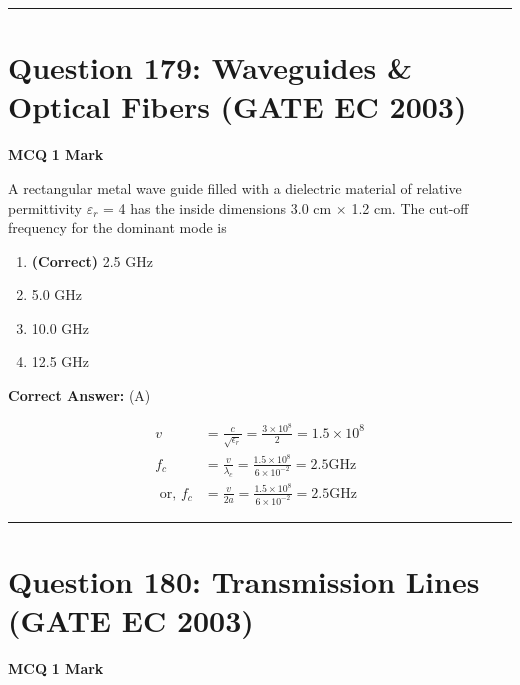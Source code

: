 \documentclass[11pt,a4paper]{article}
\begin{document}
\vspace{1.5em}
\hrule
\vspace{1.5em}

\section*{Question 179: Waveguides \& Optical Fibers (GATE EC 2003)}
\noindent \textbf{\color{primary}MCQ} \hfill \textbf{\color{secondary}1 Mark}


\noindent A rectangular metal wave guide filled with a dielectric material of relative permittivity $\varepsilon _{r}$ = 4 has the inside dimensions 3.0 cm $\times$ 1.2 cm. The cut-off frequency for the dominant mode is


\begin{enumerate}[label=(\Alph*)]
    \item \textbf{(Correct)} 2.5 GHz
    \item 5.0 GHz
    \item 10.0 GHz
    \item 12.5 GHz
\end{enumerate}

\noindent \textbf{Correct Answer:} (A)

\begin{tcolorbox}[solbox, title=Detailed Solution -- Question 179]
\[
\begin{aligned} v &=\frac{c}{\sqrt{\epsilon_{r}}}=\frac{3 \times 10^{8}}{2}=1.5 \times 10^{8} \\ f_{c} &=\frac{v}{\lambda_{c}}=\frac{1.5 \times 10^{8}}{6 \times 10^{-2}}=2.5 \mathrm{GHz} \\ \text { or, } f_{c} &=\frac{v}{2 a}=\frac{1.5 \times 10^{8}}{6 \times 10^{-2}}=2.5 \mathrm{GHz} \end{aligned}
\]
\end{tcolorbox}

\vspace{1.5em}
\hrule
\vspace{1.5em}

\section*{Question 180: Transmission Lines (GATE EC 2003)}
\noindent \textbf{\color{primary}MCQ} \hfill \textbf{\color{secondary}1 Mark}
\end{document}
